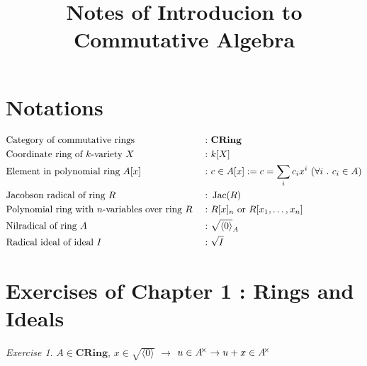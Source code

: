 \documentclass[a4paper]{article}
\theoremstyle{plain}
\theoremstyle{definition}
\theoremstyle{remark}
\newtheorem{ex}{Exercise}[section]
\newcommand{\mbf}[1]{\mathbf{#1}}
\newcommand{\unitgrp}[1]{#1^{\mspace{-4mu}\times}}
\newcommand{\gen}[1]{\langle #1 \rangle}
\newcommand{\nilradical}[1]{\sqrt{\gen{0}}_{#1}}
\newcommand{\A}{\forall}
\DeclareMathOperator{\Jac}{\rm{Jac}}
\begin{document}
    \title{Notes of Introducion to Commutative Algebra}
    \author{{\color{pink}{Cloudi}}{\color{Aquamarine}{fold}}}
    \maketitle
    \newpage

    \setcounter{section}{-1}

    \section{Notations}

    \vspace*{0.3cm}

    \begin{align*}
        & \text{Category of commutative rings }      &: \ & \mbf{CRing}\\
        & \text{Coordinate ring of $k$-variety $X$ } &: \ & k[X]\\
        & \text{Element in polynomial ring $A[x]$ }  &: \ & c \in A[x] := c=\sum_{i}c_i x^i \ (\A i \ .\ c_i \in A)\\
        & \text{Jacobson radical of ring $R$ }       &: \ & \Jac(R)\\
        & \text{Polynomial ring with $n$-variables over ring $R$ } &: \ & R[x]_n \text{ or } R[x_1, \dotsc, x_n]\\
        & \text{Nilradical of ring $A$ }             &: \ & \nilradical{A}\\
        & \text{Radical ideal of ideal $I$ }         &: \ & \sqrt{I}\\
    \end{align*}


    \section{Exercises of Chapter 1 : Rings and Ideals}

    \vspace*{0.9cm}
    
    \begin{ex}
        $A \in \mbf{CRing} $, $x \in \sqrt{\gen{0}}$ $\to$ $u \in \unitgrp{A} \to u+x \in \unitgrp{A}$
    \end{ex}
\end{document}
